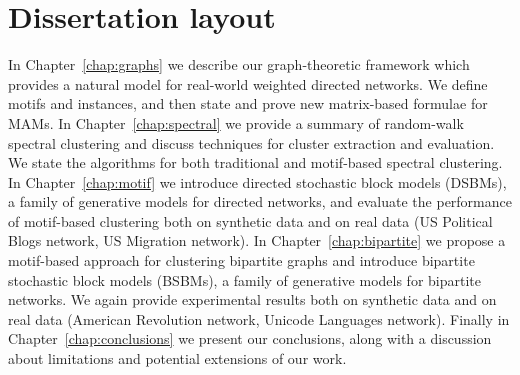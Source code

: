 \section*{Dissertation layout}

In Chapter~\ref{chap:graphs} we describe our graph-theoretic framework which provides a natural model for real-world weighted directed networks.
We define motifs and instances, and then state and prove new matrix-based formulae for MAMs.
%
In Chapter~\ref{chap:spectral} we provide a summary of random-walk spectral clustering and discuss techniques for cluster extraction and evaluation.
We state the algorithms for both traditional and motif-based spectral clustering.
%
In Chapter~\ref{chap:motif} we introduce directed stochastic block models (DSBMs), a family of generative models for directed networks, and evaluate the performance of motif-based clustering both on synthetic data and on real data (US Political Blogs network, US Migration network).
%
In Chapter~\ref{chap:bipartite} we propose a motif-based approach for clustering bipartite graphs and introduce bipartite stochastic block models (BSBMs), a family of generative models for bipartite networks. We again provide experimental results both on synthetic data and on real data (American Revolution network, Unicode Languages network).
%
Finally in Chapter~\ref{chap:conclusions} we present our conclusions, along with a discussion about limitations and potential extensions of our work.




